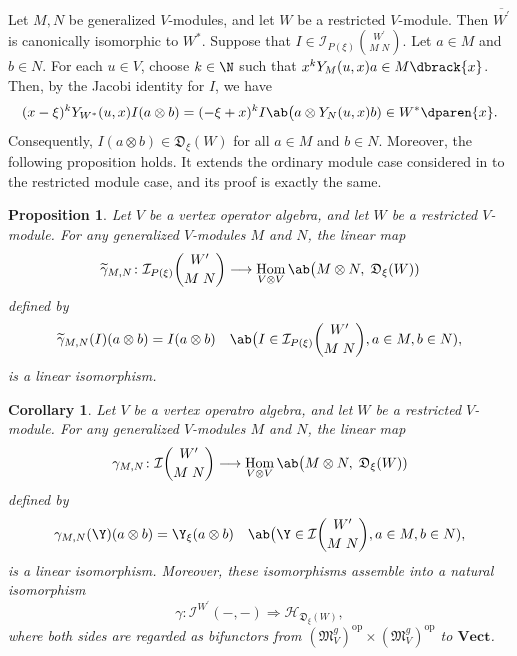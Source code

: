 \documentclass[12pt, english]{article}
\numberwithin{equation}{section}
\DeclareMathOperator{\Hom}{Hom}
\DeclareMathOperator{\opp}{op}
\theoremstyle{plain}
\newtheorem{corollary}[lemma]{Corollary}
\newtheorem{proposition}[lemma]{Proposition}
\theoremstyle{definition}
\theoremstyle{remark}
\begin{document}
	Let $M, N$ be generalized $V$-modules, and let $W$ be a restricted $V$-module.
	Then $\overline{W^\prime}$ is canonically isomorphic to $W^*$.
	Suppose that $I \in \mathcal{I}_{P(\xi)}\binom{W^\prime}{M \; N}$.
	Let $a \in M$ and $b \in N$.
	For each $u \in V$, choose $k \in \N$ such that $x^kY_{M}(u, x) a \in M\dbrack{x}$. Then, by the Jacobi identity for $I$, we have
	\[
	(x- \xi)^k Y_{W^*}(u, x) I(a \otimes b) = (-\xi + x)^kI \ab\big(a \otimes Y_{N}(u, x) b) \in W^*\dparen{x}.
	\]
	Consequently, $I(a \otimes b) \in \mathfrak{D}_{\xi}(W)$ for all $a \in M$ and $b \in N$.
	Moreover, the following proposition holds. It extends the ordinary module case considered in \cite[thoerem 4.5]{Li02} to the restricted module case, and its proof is exactly the same.
	
	\begin{proposition} \label{prop:p-intertwining-li-hom}
		Let $V$ be a vertex operator algebra, and let $W$ be a restricted $V$-module.
		For any generalized $V$-modules $M$ and $N$, the linear map
		\[
		\widetilde{\gamma}_{M, N}\colon \mathcal{I}_{P(\xi)} \binom{W^\prime}{M \; N} \longrightarrow \Hom_{V \otimes V} \ab\big(M \otimes N, \; \mathfrak{D}_{\xi}(W))
		\]
		defined by
		\[
		\widetilde{\gamma}_{M, N}(I) (a \otimes b) = I(a \otimes b) \quad \ab\big(I \in \mathcal{I}_{P(\xi)} \binom{W^\prime}{M \; N}, a \in M, b \in N),
		\]
		is a linear isomorphism.
	\end{proposition}
	
	\begin{corollary} \label{cor:li-intertwiner-hom}
		Let $V$ be a vertex operatro algebra, and let $W$ be a restricted $V$-module.
		For any generalized $V$-modules $M$ and $N$, the linear map
		\begin{align*}\label{eq:li-intertwiner-hom-map}
			\gamma_{M, N}\colon \mathcal{I} \binom{W^\prime}{M \; N} \longrightarrow \Hom_{V \otimes V} \ab\big(M \otimes N, \; \mathfrak{D}_{\xi}(W))
		\end{align*}
		defined by
		\[
		\gamma_{M, N}(\Y) (a \otimes b) = \Y_{\xi}(a \otimes b) \quad \ab\big(\Y \in \mathcal{I}\binom{W^\prime}{M \; N}, a \in M, b \in N),
		\]
		is a linear isomorphism.
		Moreover, these isomorphisms assemble into a natural isomorphism
		\[
		\gamma \colon \mathcal{I}^{W^\prime}(-, -) \Rightarrow
		\mathcal{H}_{\mathfrak{D}_{\xi}(W)},
		\]
		where  both sides are regarded as bifunctors from $(\mathfrak{M}^g_V)^{\opp}\times(\mathfrak{M}^g_V)^{\opp}$ to $\mathbf{Vect}$.
	\end{corollary}
	
\end{document}
